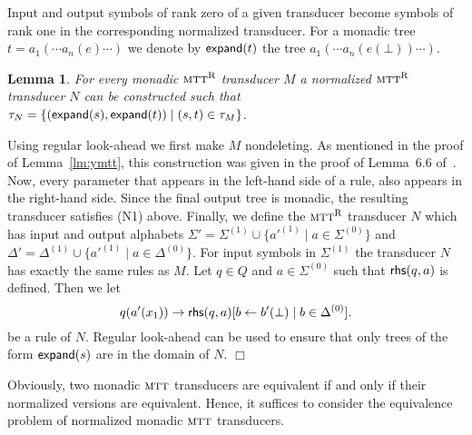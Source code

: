 \documentclass[copyright,creativecommons]{eptcs}
\newtheorem{lemma}{Lemma}
\newcommand{\eop}{\hspace*{\fill}$\Box$}
\newenvironment{proof}{{\it Proof.}\quad}{\eop\vspace*{4mm}}
\newcommand{\mtt}{\textsc{mtt}}
\newcommand{\mttr}{\textsc{mtt}^{\text{R}}}
\def\expand{{\sf expand}}
\def\rhs{{\sf rhs}}
\begin{document}
Input and output symbols of rank zero of a given transducer
become symbols of rank one in the corresponding normalized transducer.
For a monadic tree $t=a_1(\cdots a_n(e)\cdots)$ we denote by
$\expand(t)$ the tree $a_1(\cdots a_n(e(\bot))\cdots)$.

\begin{lemma}\label{lm:expand}
For every monadic $\mttr$ transducer $M$ a normalized $\mttr$ transducer $N$ can
be constructed such that $\tau_N=\{(\expand(s),\expand(t))\mid (s,t)\in\tau_M\}$.
\end{lemma}
\begin{proof}
Using regular look-ahead we first make $M$ nondeleting.
As mentioned in the proof of Lemma~\ref{lm:ymtt}, this construction was
given in the proof of Lemma~6.6 of~\cite{DBLP:journals/iandc/EngelfrietM99}.
Now, every parameter that appears in the left-hand side of a rule, also
appears in the right-hand side. Since the final output tree is monadic,
the resulting transducer satisfies (N1) above. 
Finally, we define the $\mttr$ transducer $N$ which has input and output alphabets
$\Sigma'=\Sigma^{(1)}\cup\{a'^{(1)}\mid a\in\Sigma^{(0)}\}$ and
$\Delta'=\Delta^{(1)}\cup\{a'^{(1)}\mid a\in\Delta^{(0)}\}$.
For input symbols in $\Sigma^{(1)}$ the transducer $N$ has exactly
the same rules as $M$. 
Let $q\in Q$ and $a\in\Sigma^{(0)}$ such that $\rhs(q,a)$ is defined.
Then we let 
\[
q(a'(x_1))\to\rhs(q,a)[b\leftarrow b'(\bot)\mid b\in\Delta^{(0)}].
\]
be a rule of $N$. 
Regular look-ahead can be used to ensure that only trees of
the form $\expand(s)$ are in the domain of $N$.
\end{proof}

Obviously, two monadic $\mtt$ transducers are equivalent if and only 
if their normalized versions are equivalent. Hence, it suffices to 
consider the equivalence problem of normalized monadic $\mtt$ transducers.
\end{document}
